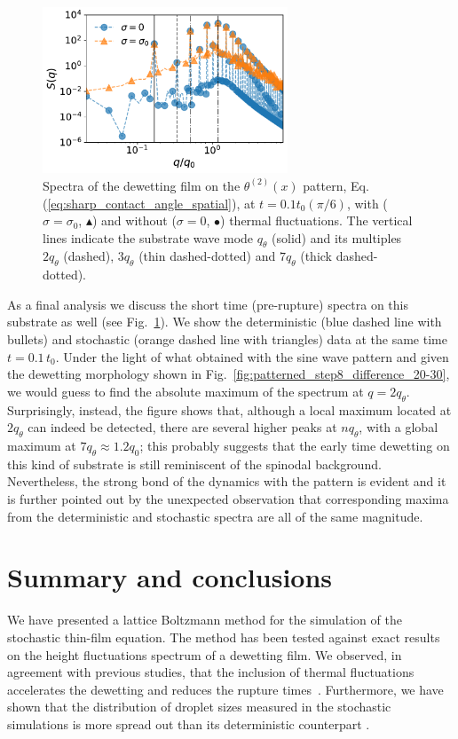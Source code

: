  \begin{figure}
     \centering
     \includegraphics[width=0.65\textwidth]{graphics/square_wave_det_stoch.pdf}
     \caption{Spectra of the dewetting film on the $\theta^{(2)}(x)$ pattern, Eq.(\ref{eq:sharp_contact_angle_spatial}), at $t = 0.1t_0(\pi/6)$, with ($\sigma = \sigma_0$, \textcolor{pyorange}{$\blacktriangle$}) and without ($\sigma =0$, \textcolor{pyblue}{$\bullet$}) thermal fluctuations. 
     The vertical lines indicate the substrate wave mode $q_{\theta}$ (solid) and its multiples $2q_{\theta}$ (dashed), $3q_{\theta}$ (thin dashed-dotted) and $7q_{\theta}$ (thick dashed-dotted).}
     \label{fig:square_wave_both}
 \end{figure}
As a final analysis we discuss the short time (pre-rupture) spectra on this substrate as well (see Fig.~\ref{fig:square_wave_both}).
We show the deterministic (blue dashed line with bullets) and stochastic (orange dashed line with triangles) data at the same time $t=0.1\,t_0$.
Under the light of what obtained with the sine wave pattern and given the dewetting morphology shown in Fig.~\ref{fig:patterned_step8_difference_20-30}, we would guess to find the absolute maximum of the spectrum at $q=2 q_{\theta}$.
Surprisingly, instead, the figure shows that, although a local maximum located at $2q_{\theta}$ can indeed be detected, there are several higher peaks at $n q_{\theta}$, with a global maximum at $7q_{\theta} \approx 1.2 q_0$; this probably suggests that the early time dewetting on this kind of substrate is still reminiscent of the spinodal background. 
Nevertheless, the strong bond of the dynamics with the pattern is evident and it is further pointed out by the unexpected observation that corresponding maxima from the deterministic and stochastic spectra are all of the same magnitude.

\section{Summary and conclusions}\label{sec:sum_conclu}
We have presented a lattice Boltzmann method for the simulation of the stochastic thin-film equation. 
The method has been tested against exact results on the height fluctuations spectrum of a dewetting film.  
We observed, in agreement with previous studies, that the inclusion of thermal fluctuations accelerates the dewetting and reduces the rupture times~\cite{grunThinFilmFlowInfluenced2006}.
Furthermore, we have shown that the distribution of droplet sizes measured in the stochastic simulations is more spread out than its deterministic counterpart \cite{nesicFullyNonlinearDynamics2015}. 

